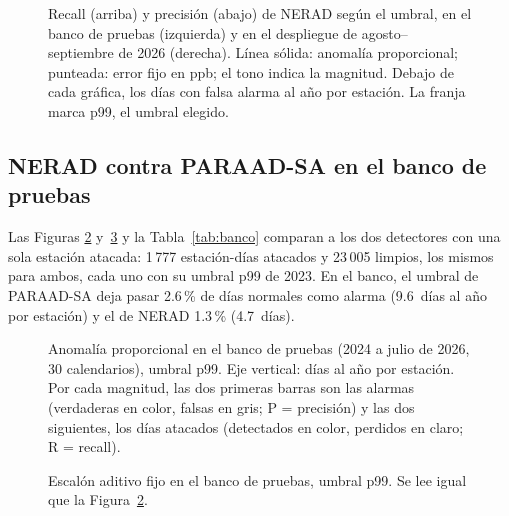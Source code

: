 \documentclass[11pt, letterpaper]{article}
\newcommand{\figurapresentacion}[1]{%
  \adjustbox{max width=\linewidth}{}}
\begin{document}
\begin{figure}[H]
  \centering
  
  \caption{Recall (arriba) y precisión (abajo) de NERAD según el umbral, en el banco de
    pruebas (izquierda) y en el despliegue de agosto--septiembre de 2026 (derecha). Línea
    sólida: anomalía proporcional; punteada: error fijo en ppb; el tono indica la magnitud.
    Debajo de cada gráfica, los días con falsa alarma al año por estación. La franja marca
    p99, el umbral elegido.}
  \label{fig:operacion}
\end{figure}

\subsection{NERAD contra PARAAD-SA en el banco de pruebas}

Las Figuras \ref{fig:comparacion} y~\ref{fig:comparacionppb} y la
Tabla~\ref{tab:banco} comparan a los dos detectores con una sola estación atacada: 1\,777
estación-días atacados y 23\,005 limpios, los mismos para ambos, cada uno con su umbral
p99 de 2023. En el banco, el umbral de PARAAD-SA deja pasar 2.6\,\% de días normales como
alarma (9.6~días al año por estación) y el de NERAD 1.3\,\% (4.7~días).

\begin{figure}[H]
  \centering
  \figurapresentacion{comparacion_pct}
  \caption{Anomalía proporcional en el banco de pruebas (2024 a julio de 2026, 30
    calendarios), umbral p99. Eje vertical: días al año por estación. Por cada magnitud,
    las dos primeras barras son las alarmas (verdaderas en color, falsas en gris; P =
    precisión) y las dos siguientes, los días atacados (detectados en color, perdidos en
    claro; R = recall).}
  \label{fig:comparacion}
\end{figure}

\begin{figure}[H]
  \centering
  \figurapresentacion{comparacion_ppb}
  \caption{Escalón aditivo fijo en el banco de pruebas, umbral p99. Se lee igual que la
    Figura~\ref{fig:comparacion}.}
  \label{fig:comparacionppb}
\end{figure}
\end{document}
